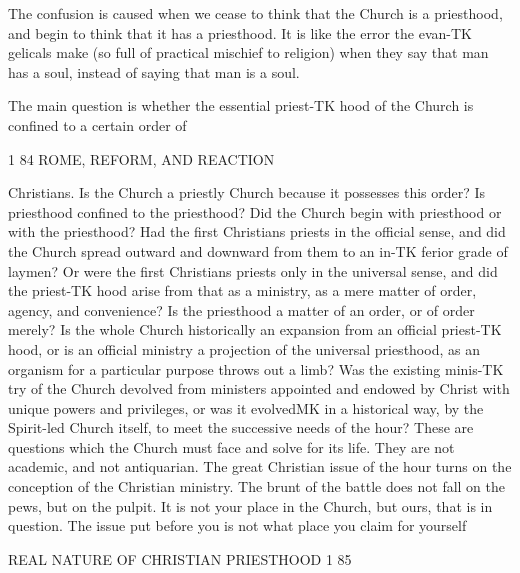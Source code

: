 \documentclass[12pt,a5paper,oneside]{book}
\begin{document}
{The confusion is caused when we cease to think 
that the Church is a priesthood, and begin to think 
that it has a priesthood. It is like the error the evan-TK
gelicals make (so full of practical mischief to religion) 
when they say that man has a soul, instead of saying 
that man is a soul. 

The main question is whether the essential priest-TK
hood of the Church is confined to a certain order of 



1 84 ROME, REFORM, AND REACTION 

Christians. Is the Church a priestly Church because 
it possesses this order? Is priesthood confined to the 
priesthood? Did the Church begin with priesthood 
or with the priesthood? Had the first Christians 
priests in the official sense, and did the Church 
spread outward and downward from them to an in-TK
ferior grade of laymen? Or were the first Christians 
priests only in the universal sense, and did the priest-TK
hood arise from that as a ministry, as a mere matter of 
order, agency, and convenience? Is the priesthood a 
matter of an order, or of order merely? Is the whole 
Church historically an expansion from an official priest-TK
hood, or is an official ministry a projection of the 
universal priesthood, as an organism for a particular 
purpose throws out a limb? Was the existing minis-TK
try of the Church devolved from ministers appointed 
and endowed by Christ with unique powers and 
privileges, or was it evolvedMK in a historical way, by the 
Spirit-led Church itself, to meet the successive needs of 
the hour? These are questions which the Church 
must face and solve for its life. They are not academic, 
and not antiquarian. The great Christian issue of 
the hour turns on the conception of the Christian 
ministry. The brunt of the battle does not fall on the 
pews, but on the pulpit. It is not your place in the 
Church, but ours, that is in question. The issue put 
before you is not what place you claim for yourself 



REAL NATURE OF CHRISTIAN PRIESTHOOD 1 85 

}
\end{document}
